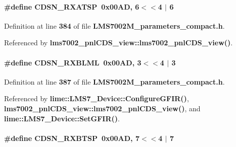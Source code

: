 \paragraph[{C\+D\+S\+N\+\_\+\+R\+X\+A\+T\+SP}]{\setlength{\rightskip}{0pt plus 5cm}\#define C\+D\+S\+N\+\_\+\+R\+X\+A\+T\+SP~0x00\+A\+D, 6$<$$<$4 $\vert$  6}\label{LMS7002M__parameters__compact_8h_a735787d52a67621b5a3c45a0d4ea1cf5}


Definition at line {\bf 384} of file {\bf L\+M\+S7002\+M\+\_\+parameters\+\_\+compact.\+h}.



Referenced by {\bf lms7002\+\_\+pnl\+C\+D\+S\+\_\+view\+::lms7002\+\_\+pnl\+C\+D\+S\+\_\+view()}.

\paragraph[{C\+D\+S\+N\+\_\+\+R\+X\+B\+L\+ML}]{\setlength{\rightskip}{0pt plus 5cm}\#define C\+D\+S\+N\+\_\+\+R\+X\+B\+L\+ML~0x00\+A\+D, 3$<$$<$4 $\vert$  3}\label{LMS7002M__parameters__compact_8h_ab0f14e948f4ac10cfc60eac217cbe318}


Definition at line {\bf 387} of file {\bf L\+M\+S7002\+M\+\_\+parameters\+\_\+compact.\+h}.



Referenced by {\bf lime\+::\+L\+M\+S7\+\_\+\+Device\+::\+Configure\+G\+F\+I\+R()}, {\bf lms7002\+\_\+pnl\+C\+D\+S\+\_\+view\+::lms7002\+\_\+pnl\+C\+D\+S\+\_\+view()}, and {\bf lime\+::\+L\+M\+S7\+\_\+\+Device\+::\+Set\+G\+F\+I\+R()}.

\paragraph[{C\+D\+S\+N\+\_\+\+R\+X\+B\+T\+SP}]{\setlength{\rightskip}{0pt plus 5cm}\#define C\+D\+S\+N\+\_\+\+R\+X\+B\+T\+SP~0x00\+A\+D, 7$<$$<$4 $\vert$  7}\label{LMS7002M__parameters__compact_8h_a739e2c3fc8688b008f118c78ed177e87}


